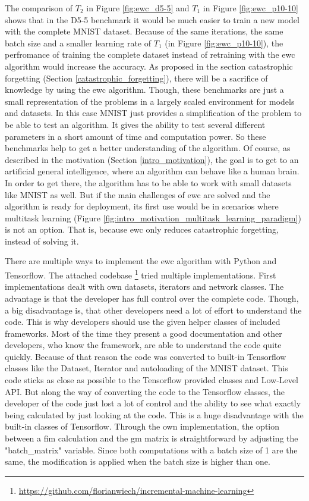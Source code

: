 The comparison of $T_2$ in Figure \ref{fig:ewc_d5-5} and $T_1$ in Figure \ref{fig:ewc_p10-10} shows that in the D5-5 benchmark it would be much easier to train a new model with the complete MNIST dataset.
Because of the same iterations, the same batch size and a smaller learning rate of $T_1$ (in Figure \ref{fig:ewc_p10-10}), the perfromance of training the complete dataset instead of retraining with the \acrshort{ewc} algorithm would increase the accuracy.
As proposed in the section catastrophic forgetting (Section \ref{catastrophic_forgetting}), there will be a sacrifice of knowledge by using the \acrshort{ewc} algorithm.
Though, these benchmarks are just a small representation of the problems in a largely scaled environment for models and datasets.
In this case MNIST just provides a simplification of the problem to be able to test an algorithm.
It gives the ability to test several different parameters in a short amount of time and computation power.
So these benchmarks help to get a better understanding of the algorithm.
\newline
Of course, as described in the motivation (Section \ref{intro_motivation}), the goal is to get to an artificial general intelligence, where an algorithm can behave like a human brain.
In order to get there, the algorithm has to be able to work with small datasets like MNIST as well.
But if the main challenges of \acrshort{ewc} are solved and the algorithm is ready for deployment, its first use would be in scenarios where multitask learning (Figure \ref{fig:intro_motivation_multitask_learning_paradigm}) is not an option.
That is, because \acrshort{ewc} only reduces catastrophic forgetting, instead of solving it.

There are multiple ways to implement the \acrshort{ewc} algorithm with Python and Tensorflow.
The attached codebase \footnote{\url{https://github.com/florianwiech/incremental-machine-learning}} tried multiple implementations.
First implementations dealt with own datasets, iterators and network classes.
The advantage is that the developer has full control over the complete code.
Though, a big disadvantage is, that other developers need a lot of effort to understand the code.
This is why developers should use the given helper classes of included frameworks.
Most of the time they present a good documentation and other developers, who know the framework, are able to understand the code quite quickly.
Because of that reason the code was converted to built-in Tensorflow classes like the Dataset, Iterator and autoloading of the MNIST dataset.
This code sticks as close as possible to the Tensorflow provided classes and Low-Level API.
But along the way of converting the code to the Tensorflow classes, the developer of the code just lost a lot of control and the ability to see what exactly being calculated by just looking at the code.
This is a huge disadvantage with the built-in classes of Tensorflow.
\newline
Through the own implementation, the option between a \acrshort{fim} calculation and the \acrshort{gm} matrix is straightforward by adjusting the "batch\_matrix" variable.
Since both computations with a batch size of 1 are the same, the modification is applied when the batch size is higher than one.


